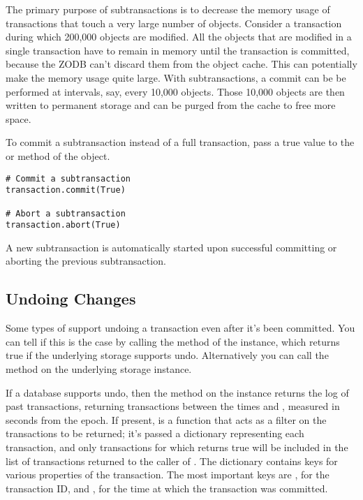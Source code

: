 The primary purpose of subtransactions is to decrease the memory usage
of transactions that touch a very large number of objects.  Consider a
transaction during which 200,000 objects are modified.  All the
objects that are modified in a single transaction have to remain in
memory until the transaction is committed, because the ZODB can't
discard them from the object cache.  This can potentially make the
memory usage quite large.  With subtransactions, a commit can be be
performed at intervals, say, every 10,000 objects.  Those 10,000
objects are then written to permanent storage and can be purged from
the cache to free more space.

To commit a subtransaction instead of a full transaction,
pass a true value to the 
or  method of the  object.

\begin{verbatim}
# Commit a subtransaction
transaction.commit(True)

# Abort a subtransaction
transaction.abort(True)
\end{verbatim}

A new subtransaction is automatically started upon successful committing
or aborting the previous subtransaction.


\subsection{Undoing Changes}

Some types of  support undoing a transaction even after
it's been committed.  You can tell if this is the case by calling the
 method of the  instance, which
returns true if the underlying storage supports undo.  Alternatively
you can call the  method on the underlying
storage instance.

If a database supports undo, then the  method on the  instance returns
the log of past transactions, returning transactions between the times
 and , measured in seconds from the epoch.
If present,  is a function that acts as a filter on the
transactions to be returned; it's passed a dictionary representing
each transaction, and only transactions for which  returns
true will be included in the list of transactions returned to the
caller of .  The dictionary contains keys for
various properties of the transaction.  The most important keys are
, for the transaction ID, and , for the time at
which the transaction was committed.

